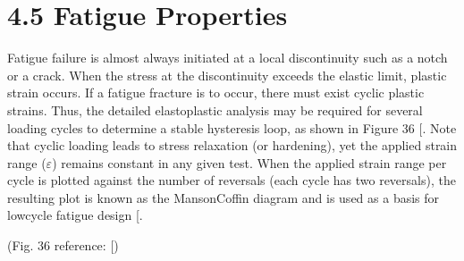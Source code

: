 \documentclass[letterpaper,10pt,english]{jupyterBook}
\begin{document}
	\section{4.5 Fatigue Properties}
	\label{\detokenize{4 Mechanical Properties:fatigue-properties}}
	\sphinxAtStartPar
	Fatigue failure is almost always initiated at a local discontinuity such as a notch or a crack. When the stress at the discontinuity exceeds the elastic limit, plastic strain occurs. If a fatigue fracture is to occur, there must exist cyclic plastic strains. Thus, the detailed elastoplastic analysis may be required for several loading cycles to determine a stable hysteresis loop, as shown in Figure 36 {[}\sphinxhref{https://www.mheducation.com/highered/product/shigley-s-mechanical-engineering-design-budynas-nisbett/M9780073398211.html}{Shigley2020}{]}. Note that cyclic loading leads to stress relaxation (or hardening), yet the applied strain range (\(\varepsilon\)) remains constant in any given test.  When the applied strain range per cycle is plotted against the number of reversals (each cycle has two reversals), the resulting plot is known as the Manson\sphinxhyphen{}Coffin diagram and is used as a basis for low\sphinxhyphen{}cycle fatigue design {[}\sphinxhref{https://www.mheducation.com/highered/product/shigley-s-mechanical-engineering-design-budynas-nisbett/M9780073398211.html}{Shigley2020}{]}.
	
	
	
	\sphinxAtStartPar
	(Fig. 36 reference: {[}\sphinxhref{https://www.mheducation.com/highered/product/shigley-s-mechanical-engineering-design-budynas-nisbett/M9780073398211.html}{Shigley2020}{]})
	
\end{document}
